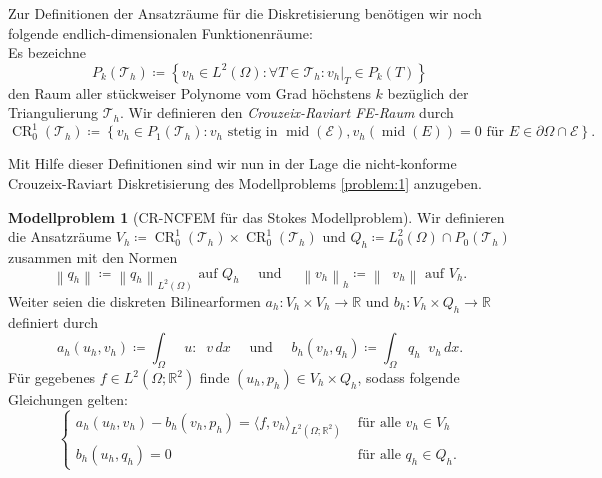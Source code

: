 \message{ !name(script.tex)}\documentclass[a4paper]{scrartcl}
\newcommand{\real}{\mathbb{R}}
\newcommand{\Ltwo}{L^2}
\newcommand{\crfem}{\operatorname{CR}_0^1}
\newcommand{\mesh}{\mathcal{T}_h}
\newcommand{\edges}{\mathcal{E}}
\newcommand{\dx}{\,dx}
\newcommand{\norm}[1]{\left\lVert#1\right\rVert}
\newcommand{\hnorm}[1]{\left\lVert#1\right\rVert_h}
\newcommand{\set}[1]{\left\{#1\right\}}
\DeclareMathOperator{\divh}{div_h}
\DeclareMathOperator{\nablah}{\nabla_{\textit{h}}}
\DeclareMathOperator{\midOp}{mid}
\theoremstyle{plain}
\theoremstyle{definition}
\newtheorem{modellproblem}{Modellproblem}
\theoremstyle{remark}
\begin{document}
\noindent Zur Definitionen der Ansatzräume für die Diskretisierung
benötigen wir noch folgende endlich-dimensionalen Funktionenräume: \\
Es bezeichne 
\[P_k(\mesh) \coloneqq \set{v_h \in \Ltwo(\Omega)\colon \forall T \in
  \mesh\colon v_h|_T \in P_k(T)}\]
den Raum aller stückweiser Polynome vom Grad höchstens \(k\) bezüglich
der Triangulierung \(\mesh\). Wir definieren den \emph{Crouzeix-Raviart
FE-Raum} durch 
\begin{equation}
  \label{eq:9}
  \crfem(\mesh) \coloneqq \set{v_h \in P_1(\mesh)\colon v_h \text{ stetig in } \midOp(\edges), v_h(\midOp(E)) = 0 \text{ für } E \in \partial\Omega\cap\edges}.
\end{equation}

\noindent Mit Hilfe dieser Definitionen sind wir nun in der Lage die
nicht-konforme Crouzeix-Raviart Diskretisierung des Modellproblems
\ref{problem:1} anzugeben. 

\begin{modellproblem}[CR-NCFEM für das Stokes
  Modellproblem] \label{problem:3}
  Wir definieren die Ansatzräume \(V_h \coloneqq \crfem(\mesh) \times
  \crfem(\mesh)\) und \(Q_h \coloneqq \Ltwo_0(\Omega) \cap
  P_0(\mesh)\) zusammen mit den Normen 
  \begin{equation}
    \label{eq:10}
    \norm{q_h} \coloneqq \norm{q_h}_{\Ltwo(\Omega)} \text{ auf } Q_h
    \quad \text{ und } \quad
    \hnorm{v_h} \coloneqq \norm{\nablah v_h} \text{ auf } V_h. 
  \end{equation}
  Weiter seien die diskreten Bilinearformen \(a_h\colon V_h \times V_h
  \rightarrow \real\) und \(b_h\colon V_h \times Q_h \rightarrow
  \real\) definiert durch
  \begin{equation}
    \label{eq:11}
    a_h(u_h, v_h) \coloneqq \int_\Omega \nablah u : \nablah v \dx
    \quad \text{ und } \quad b_h(v_h, q_h) \coloneqq \int_\Omega q_h\divh v_h \dx. 
  \end{equation}
  Für gegebenes \(f \in \Ltwo(\Omega; \real^2)\) finde \((u_h, p_h)
  \in V_h \times Q_h\), sodass folgende Gleichungen gelten: 
  \begin{equation}
    \label{eq:12}
    \begin{cases}
      a_h(u_h, v_h) - b_h(v_h, p_h) = \langle f, v_h \rangle_{\Ltwo(\Omega; \real^2)} & \text{ für alle } v_h \in V_h \\
      b_h(u_h, q_h) = 0 & \text{ für alle } q_h \in Q_h. 
    \end{cases}
  \end{equation}
  \end{modellproblem}
\end{document}

